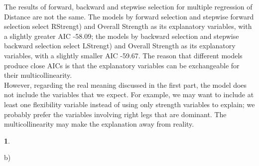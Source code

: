 \documentclass[10pt]{article}
\newtheorem{prob}{\bm{$Problem$}}
\begin{document}
\begin{enumerate}[1)]
The results of forward, backward and stepwise selection for multiple regression of Distance are not the same. The models by forward selection and stepwise forward selection select {\ttfamily RStrengt)} and {\ttfamily Overall Strength} as its explanatory variables, with a slightly greater AIC -58.09; the models by backward selection and stepwise backward selection select {\ttfamily LStrengt)} and {\ttfamily Overall Strength} as its explanatory variables, with a slightly smaller AIC -59.67. The reason that different models produce close AICs is that the explanatory variables can be exchangeable for their multicollinearity.\\
However, regarding the real meaning discussed in the first part, the model does not include the variables that we expect. For example, we may want to include at least one flexibility variable instead of using only strength variables to explain; we probably prefer the variables involving right legs that are dominant. The multicollinearity may make the explanation away from reality.

\end{enumerate}

\newpage

\begin{prob}
\end{prob}
\vspace{3mm}

b)
\end{document}
